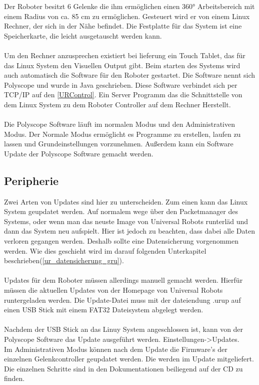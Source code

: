 Der Roboter besitzt 6 Gelenke die ihm ermöglichen einen 360° Arbeitsbereich mit einem Radius von ca. 85 cm zu ermöglichen. Gesteuert wird er von einem Linux Rechner, der sich in der Nähe befindet.
Die Festplatte für das System ist eine Speicherkarte, die leicht ausgetauscht werden kann.
\\\\
Um den Rechner anzusprechen existiert bei lieferung ein Touch Tablet, das für das Linux System den Visuellen Output gibt. Beim starten des Systems wird auch automatisch die Software für den Roboter gestartet. Die Software nennt sich Polyscope und wurde in Java geschrieben. Diese Software verbindet sich per TCP/IP auf den \ref{URControl}. Ein Server Programm das die Schnittstelle von dem Linux System zu dem Roboter Controller auf dem Rechner Herstellt.
\\\\
Die Polyscope Software läuft im normalen Modus und den Administrativen Modus. Der Normale Modus ermöglicht es Programme zu erstellen, laufen zu lassen und Grundeinstellungen vorzunehmen. Außerdem kann ein Software Update der Polyscope Software gemacht werden.

\subsection{Peripherie}
\label{sub:ur_update_gru}

Zwei Arten von Updates sind hier zu unterscheiden. Zum einen kann das Linux System geupdatet werden. Auf normalem wege über den Packetmanager des Systems, oder wenn man das neuste Image von Universal Robots runterläd und dann das System neu aufspielt. Hier ist jedoch zu beachten, dass dabei alle Daten verloren gegangen werden. Deshalb sollte eine Datensicherung vorgenommen werden. Wie dies geschieht wird im darauf folgenden Unterkapitel beschrieben(\ref{ur_datensicherung_gru}).
\\\\
Updates für dem Roboter müssen allerdings manuell gemacht werden. Hierfür müssen die aktuellen Updates von der Homepage von Universal Robots runtergeladen werden. Die Update-Datei muss mit der dateiendung .urup auf einen USB Stick mit einem FAT32 Dateisystem abgelegt werden.\\\\
Nachdem der USB Stick an das Linuy System angeschlossen ist, kann von der Polyscope Software das Update ausgeführt werden. Einstellungen->Updates.\\
Im Administrativen Modus können nach dem Update die Firmware's der einzelnen Gelenkcontroller geupdatet werden. Die werden im Update mitgeliefert. Die einzelnen Schritte sind in den Dokumentationen beiliegend auf der CD zu finden.

